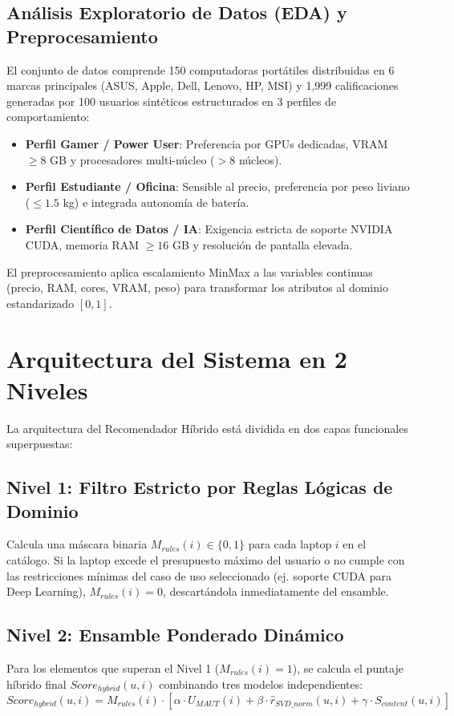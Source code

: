 \subsection{Análisis Exploratorio de Datos (EDA) y Preprocesamiento}
El conjunto de datos comprende 150 computadoras portátiles distribuidas en 6 marcas principales (ASUS, Apple, Dell, Lenovo, HP, MSI) y 1,999 calificaciones generadas por 100 usuarios sintéticos estructurados en 3 perfiles de comportamiento:
\begin{itemize}
    \item \textbf{Perfil Gamer / Power User}: Preferencia por GPUs dedicadas, VRAM $\ge 8$ GB y procesadores multi-núcleo ($>8$ núcleos).
    \item \textbf{Perfil Estudiante / Oficina}: Sensible al precio, preferencia por peso liviano ($\le 1.5$ kg) e integrada autonomía de batería.
    \item \textbf{Perfil Científico de Datos / IA}: Exigencia estricta de soporte NVIDIA CUDA, memoria RAM $\ge 16$ GB y resolución de pantalla elevada.
\end{itemize}

El preprocesamiento aplica escalamiento MinMax a las variables continuas (precio, RAM, cores, VRAM, peso) para transformar los atributos al dominio estandarizado $[0, 1]$.

\section{Arquitectura del Sistema en 2 Niveles}
La arquitectura del Recomendador Híbrido está dividida en dos capas funcionales superpuestas:

\subsection{Nivel 1: Filtro Estricto por Reglas Lógicas de Dominio}
Calcula una máscara binaria $M_{rules}(i) \in \{0, 1\}$ para cada laptop $i$ en el catálogo. Si la laptop excede el presupuesto máximo del usuario o no cumple con las restricciones mínimas del caso de uso seleccionado (ej. soporte CUDA para Deep Learning), $M_{rules}(i) = 0$, descartándola inmediatamente del ensamble.

\subsection{Nivel 2: Ensamble Ponderado Dinámico}
Para los elementos que superan el Nivel 1 ($M_{rules}(i) = 1$), se calcula el puntaje híbrido final $Score_{hybrid}(u, i)$ combinando tres modelos independientes:
\begin{equation}
Score_{hybrid}(u, i) = M_{rules}(i) \cdot \left[ \alpha \cdot U_{MAUT}(i) + \beta \cdot \hat{r}_{SVD\_norm}(u, i) + \gamma \cdot S_{content}(u, i) \right]
\end{equation}


